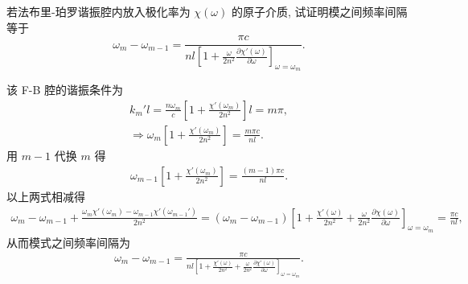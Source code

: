 \documentclass[twoside]{note}
\begin{document}
\begin{exe}
    若法布里-珀罗谐振腔内放入极化率为 $\chi(\omega)$ 的原子介质, 试证明模之间频率间隔等于
    \[
        \omega_m-\omega_{m-1}=\frac{\pi c}{nl\left[1+\frac{\omega}{2n^2}\frac{\partial\chi'(\omega)}{\partial\omega}\right]_{\omega=\omega_m}}.
    \]
\end{exe}
\begin{pf}
    该 F-B 腔的谐振条件为
    \begin{gather}
        k_m'l=\frac{n\omega_m}{c}\left[1+\frac{\chi'(\omega_m)}{2n^2}\right]l=m\pi,\\
        \Longrightarrow\omega_m\left[1+\frac{\chi'(\omega_m)}{2n^2}\right]=\frac{m\pi c}{nl}.
    \end{gather}
    用 $m-1$ 代换 $m$ 得
    \begin{align}
        \omega_{m-1}\left[1+\frac{\chi'(\omega_m)}{2n^2}\right]=\frac{(m-1)\pi c}{nl}.
    \end{align}
    以上两式相减得
    \begin{align}
        \omega_m-\omega_{m-1}+\frac{\omega_m\chi'(\omega_m)-\omega_{m-1}\chi'(\omega_{m-1}')}{2n^2}=(\omega_m-\omega_{m-1})\left[1+\frac{\chi'(\omega)}{2n^2}+\frac{\omega}{2n^2}\frac{\partial\chi(\omega)}{\partial\omega}\right]_{\omega=\omega_m}=\frac{\pi c}{nl},
    \end{align}
    从而模式之间频率间隔为
    \begin{align}
        \omega_m-\omega_{m-1}=\frac{\pi c}{nl\left[1+\frac{\chi'(\omega)}{2n^2}+\frac{\omega}{2n^2}\frac{\partial\chi'(\omega)}{\partial\omega}\right]_{\omega=\omega_m}}.
    \end{align}
\end{pf}
\end{document}
